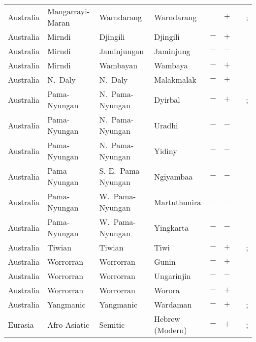 \begin{landscape}
\begin{longtable}{l>{\raggedright\arraybackslash}p{2.2cm}>{\raggedright}p{2.5cm}>{\raggedright\arraybackslash}p{2.5cm}cc>{\raggedright\arraybackslash}p{3.4cm}>{\raggedright\arraybackslash}p{3.4cm}}
Australia & Mangarrayi-Maran & Warndarang & Warndarang & $-$ & $+$ & \citealt{Gil2013} & \citealt[299]{Nichols1992}; \citealt[22--23]{Heath1980}\\
Australia & Mirndi & Djingili & Djingili & $-$ & $+$ & \citealt{Gil2013} & \citealt[247--248, 253--259]{Pensalfini1997}\\
Australia & Mirndi & Jaminjungan & Jaminjung & $-$ & $-$ & \citealt{Gil2013} & \citealt[passim]{Schultze-Berndt2000}\\
Australia & Mirndi & Wambayan & Wambaya & $-$ & $+$ & \citealt[72--80]{Nordlinger1998}& \citealt[59--70]{Nordlinger1998}\\
Australia & N.~Daly & N.~Daly & Malakmalak & $-$ & $+$ & \citealt{Gil2013} & \citealt[30--31]{Birk1976}\\
Australia & Pama-Nyungan & N.~Pama-Nyungan & Dyirbal & $-$ & $+$ & \citealt{Gil2013} & \citealt{Corbett2013}; \citealt[44]{Dixon1972}\\
Australia & Pama-Nyungan & N.~Pama-Nyungan & Uradhi & $-$ & $-$ & \citealt{Gil2013} & \citealt{Corbett2013}\\
Australia & Pama-Nyungan & N.~Pama-Nyungan & Yidiny & $-$ & $-$ & \citealt{Gil2013} & \citealt{Corbett2013}\\
Australia & Pama-Nyungan & S.-E.~Pama-Nyungan & Ngiyambaa & $-$ & $-$ & \citealt{Gil2013} & \citealt{Corbett2013}\\
Australia & Pama-Nyungan & W.~Pama-Nyungan & Martuthunira & $-$ & $-$ & \citealt{Gil2013} & \citealt{Corbett2013}\\
Australia & Pama-Nyungan & W.~Pama-Nyungan & Yingkarta & $-$ & $-$ & \citealt{Gil2013} & \citealt[20]{Dench1998}\\
Australia & Tiwian & Tiwian & Tiwi & $-$ & $+$ & \citealt{Gil2013} & \citealt{Corbett2013}; \citealt[51--52]{Osborne1974}\\
Australia & Worrorran & Worrorran & Gunin & $-$ & $+$ & \citealt{Gil2013} & \citealt[146--149]{McGregor2004}\\
Australia & Worrorran & Worrorran & Ungarinjin & $-$ & $-$ & \citealt{Gil2013} & \citealt[299]{Nichols1992}\\
Australia & Worrorran & Worrorran & Worora & $-$ & $+$ & \citealt{Gil2013} & \citealt[95]{Clendon2000}\\
Australia & Yangmanic & Yangmanic & Wardaman & $-$ & $+$ & \citealt[120]{Merlan1994}& \citealt{Corbett2013}; \citealt[61--63, 241--242]{Merlan1994}\\
Eurasia & Afro-Asiatic & Semitic & Hebrew (Modern) & $-$ & $+$ & \citealt{Gil2013} & \citealt{Corbett2013}; \citealt[51--52, 91, 104, 117--120, 185--198]{Glinert1989}\\

\end{longtable}
\end{landscape}
